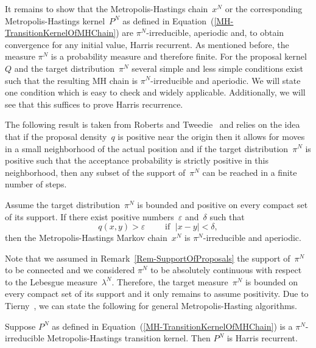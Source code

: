 It remains to show that the Metropolis-Hastings chain~$x^N$ or the corresponding Metropolis-Hastings kernel~$P^{N}$ as defined in Equation~(\ref{MH-TransitionKernelOfMHChain}) are $\pi^{N}$-irreducible, aperiodic and, to obtain convergence for any initial value, Harris recurrent. As mentioned before, the measure $\pi^{N}$ is a probability measure and therefore finite. For the proposal kernel~$Q$ and the target distribution~$\pi^{N}$  several simple and less simple conditions exist such that the resulting MH chain is $\pi^{N}$-irreducible and aperiodic. We will state one condition which is easy to check and widely applicable. Additionally, we will see that this suffices to prove Harris recurrence.

The following result is taken from Roberts and Tweedie~\autocite{RobertsTweedie1996} and relies on the idea that if the proposal density~$q$ is positive near the origin then it allows for moves in a small neighborhood of the actual position and if the target distribution~$\pi^{N}$ is positive such that the acceptance probability is strictly positive in this neighborhood, then any subset of the support of~$\pi^{N}$ can be reached in a finite number of steps.

\begin{lemma}\autocite{RobertsTweedie1996}
\label{lemma - Assumptions on Q}
  Assume the target distribution~$\pi^{N}$ is bounded and positive on every compact set of its support. If there exist positive numbers~$\varepsilon$ and~$\delta$ such that
  \begin{equation}
   \label{MH - Conditions for irrducibility}
   q(x, y) > \varepsilon \qquad \text{ if } \; |x-y| < \delta,
  \end{equation}
  then the Metropolis-Hastings Markov chain~$x^{N}$ is $\pi^{N}$-irreducible and aperiodic.

\end{lemma}

Note that we assumed in Remark~\ref{Rem-SupportOfProposals} the support of~$\pi^{N}$ to be connected and we considered $\pi^N$ to be absolutely continuous with respect to the Lebesgue measure~$\lambda^N$. Therefore, the target measure~$\pi^N$ is bounded on every compact set of its support and it only remains to assume positivity. Due to Tierny~\autocite{Tierny1994}, we can state the following for general Metropolis-Hasting algorithms.

\begin{lemma}\autocite[Corollary 2]{Tierny1994}
\label{Lemma - Harris reccurence}
 \label{MH - Harris recurrence for MH algorithms}
 Suppose $P^{N}$ as defined in Equation~(\ref{MH-TransitionKernelOfMHChain}) is a $\pi^N$-irreducible Metropolis-Hastings transition kernel. Then $P^{N}$ is Harris recurrent.
\end{lemma}

